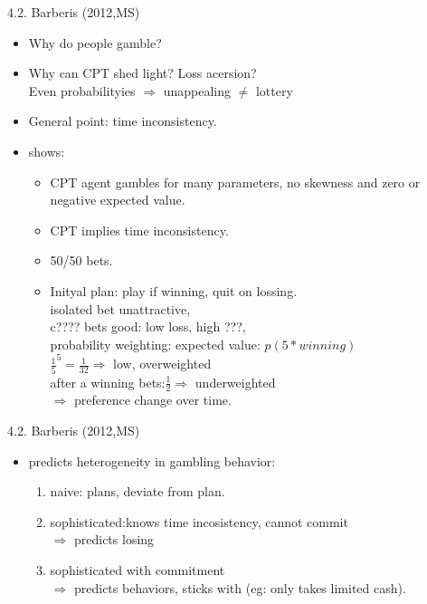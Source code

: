 \documentclass[11pt,aspectratio=169]{beamer}
\begin{document}
\begin{frame}{4.2. Barberis (2012,MS)}
    \begin{itemize}
        \item Why do people gamble? \medskip
        \item Why can CPT shed light? Loss acersion? \\\medskip
        Even probabilityies $\Rightarrow$ unappealing  $ \neq $ lottery
        \item General point: time inconsistency.\\
        \item shows:
        \begin{itemize}
            \item CPT agent gambles for many parameters, no skewness and zero or negative expected value.  \medskip
            \item CPT implies time inconsistency.  \medskip
            \item 50/50 bets.
            \item Inityal plan: play if winning, quit on lossing.\\
             isolated bet unattractive,\\
            c???? bets good:  low loss, high ???,\\
              probability weighting: expected value: $p(5*winning)$\\
              $\frac{1}{5}^5=\frac{1}{32} \Rightarrow $ low, overweighted\\
              after a winning bets:$\frac{1}{2} \Rightarrow$ underweighted\\
              $\Rightarrow $ preference change over time.
        \end{itemize}
    \end{itemize}
\end{frame}


\begin{frame}{4.2. Barberis (2012,MS)}
    \begin{itemize}
        \item predicts heterogeneity in gambling behavior:\\
        \begin{enumerate}
            \item naive: plans, deviate from plan.\\
            \item sophisticated:knows time incosistency, cannot commit\\
            $\Rightarrow$ predicts losing
            \item sophisticated with commitment\\
            $\Rightarrow$ predicts behaviors, sticks with (eg: only takes limited cash).\\
        \end{enumerate}
    \end{itemize}
\end{frame}
\end{document}
